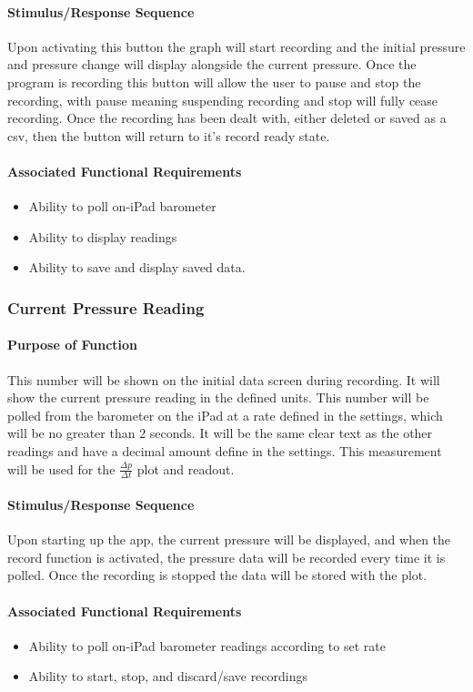 \documentclass[onecolumn, draftclsnofoot,10pt, compsoc]{IEEEtran}
\begin{document}
\paragraph{Stimulus/Response Sequence}
Upon activating this button the graph will start recording and the initial pressure and pressure change will display alongside the current pressure.
Once the program is recording this button will allow the user to pause and stop the recording, with pause meaning suspending recording and stop will fully cease recording.
Once the recording has been dealt with, either deleted or saved as a csv, then the button will return to it's record ready state.
\paragraph{Associated Functional Requirements}
\begin{itemize}
\item Ability to poll on-iPad barometer
\item Ability to display readings
\item Ability to save and display saved data.
\end{itemize}

\subsubsection{Current Pressure Reading}
\paragraph{Purpose of Function}
This number will be shown on the initial data screen during recording.
It will show the current pressure reading in the defined units.
This number will be polled from the barometer on the iPad at a rate defined in the settings, which will be no greater than 2 seconds.
It will be the same clear text as the other readings and have a decimal amount define in the settings.
This measurement will be used for the $\frac{\Delta p}{\Delta t}$ plot and readout.
\paragraph{Stimulus/Response Sequence}
Upon starting up the app, the current pressure will be displayed, and when the record function is activated, the pressure data will be recorded every time it is polled.
Once the recording is stopped the data will be stored with the plot.
\paragraph{Associated Functional Requirements}
\begin{itemize}
\item Ability to poll on-iPad barometer readings according to set rate
\item Ability to start, stop, and discard/save recordings
\end{itemize}
\end{document}
